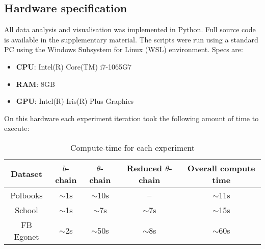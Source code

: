 \subsection{Hardware specification}
\label{appdx:imp-details}

All data analysis and visualisation was implemented in Python. Full source code is available in the supplementary material. The scripts were run using a standard PC using the Windows Subsystem for Linux (WSL) environment. Specs are:

\begin{itemize}
	\item \textbf{CPU}: Intel(R) Core(TM) i7-1065G7
	\item \textbf{RAM}: 8GB
	\item \textbf{GPU}: Intel(R) Iris(R) Plus Graphics
\end{itemize}

On this hardware each experiment iteration took the following amount of time to execute:

\begin{table}[!h]
	\centering
	\caption{Compute-time for each experiment}
	\label{tab:compute-time}
	\begin{tabular}{c|ccc|c}
		Dataset & $b$-chain & $\theta$-chain & Reduced $\theta$-chain & Overall compute time \\ \hline
		Polbooks & $\sim$1s & $\sim$10s & -- & $\sim$11s \\
		School & $\sim$1s & $\sim$7s & $\sim$7s & $\sim$15s \\
		FB Egonet & $\sim$2s & $\sim$50s & $\sim$8s & $\sim$60s
	\end{tabular}
\end{table}

